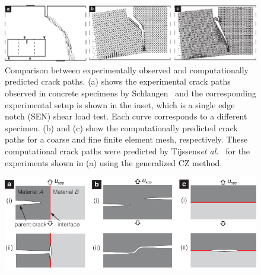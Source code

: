 \documentclass[10pt,letterpaper]{article}
\begin{document}
    \begin{figure}
          \centering
          \includegraphics[width=1.0\textwidth]{Figures/CZM/CZM_crack_path_ver3.pdf}
          \caption{\footnotesize Comparison between experimentally observed and computationally predicted crack paths. (a) shows the experimental crack paths observed in concrete specimens by Schlangen~\cite{schlangen1993experimental} and the corresponding experimental setup is shown in the inset, which is a single edge notch (SEN) shear load test. Each curve corresponds to a different specimen. (b) and (c) show the computationally predicted crack paths for a coarse and fine finite  element mesh, respectively. These computational crack paths  were predicted by Tijssens\textit{et al.}~\cite{tijssens2000numerical} for the experiments shown in (a) using the generalized CZ method.}
          \label{f:czm}
    \end{figure}

    \begin{figure}
          \centering
          \includegraphics[width=1.0\textwidth]{Figures/CZM/CrackPathTopology_V1.pdf}
          \caption{\footnotesize}
          \label{f:topchanges}
    \end{figure}
\end{document}
